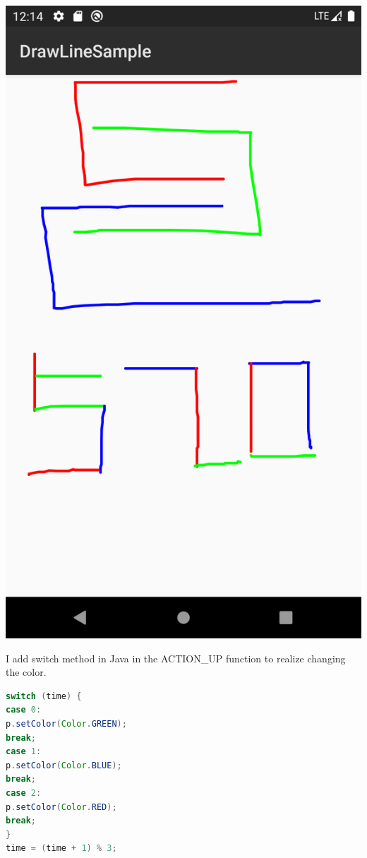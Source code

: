 \documentclass{article}
\begin{document}
\begin{center}
		\includegraphics[scale=0.17]{Colorful_520.png}
	\end{center}

	I add switch method in Java in the ACTION\_UP function to realize changing the color. 
	
	\begin{lstlisting}[language={java}]
switch (time) {
case 0:
p.setColor(Color.GREEN);
break;
case 1:
p.setColor(Color.BLUE);
break;
case 2:
p.setColor(Color.RED);
break;
}
time = (time + 1) % 3;
	\end{lstlisting}
	
\end{document}
